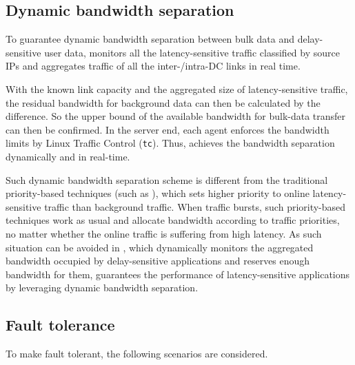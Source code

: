 \subsection{Dynamic bandwidth separation}
\label{subsec:system:separation}


To guarantee dynamic bandwidth separation between bulk data and delay-sensitive user data, \name monitors all the latency-sensitive traffic classified by source IPs and aggregates traffic of all the inter-/intra-DC links in real time.

With the known link capacity and the aggregated size of latency-sensitive traffic, the residual bandwidth for background data can then be calculated by the difference. So the upper bound of the available bandwidth for bulk-data transfer can then be confirmed. In the server end, each agent enforces the bandwidth limits by Linux Traffic Control (\texttt{tc}). Thus, \name achieves the bandwidth separation dynamically and in real-time.

Such dynamic bandwidth separation scheme is different from the traditional priority-based techniques (such as \cite{kumar2015bwe}), which sets higher priority to online latency-sensitive traffic than background traffic. When traffic bursts, such priority-based techniques work as usual and allocate bandwidth according to traffic priorities, no matter whether the online traffic is suffering from high latency. As such situation can be avoided in \name, which dynamically monitors the aggregated bandwidth occupied by delay-sensitive applications and reserves enough bandwidth for them, \name guarantees the performance of latency-sensitive applications by leveraging dynamic bandwidth separation.




\subsection{Fault tolerance}
\label{subsec:system:fault}
To make \name fault tolerant, the following scenarios are considered.%

